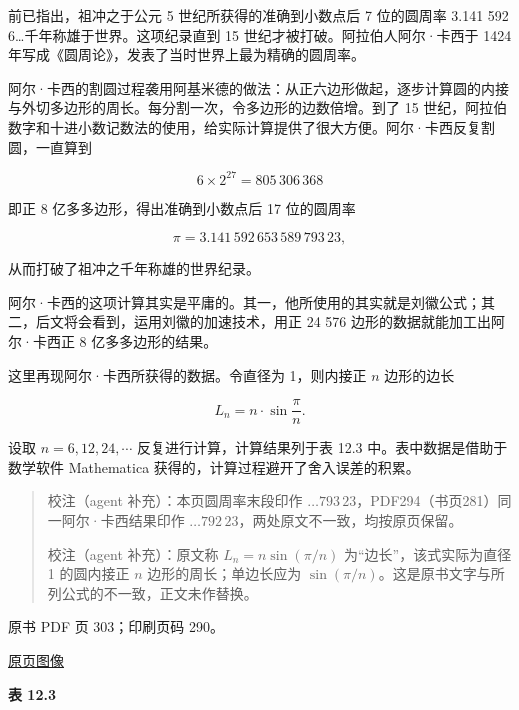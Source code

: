 前已指出，祖冲之于公元 5 世纪所获得的准确到小数点后 7 位的圆周率 3.141 592 6\ldots 千年称雄于世界。这项纪录直到 15 世纪才被打破。阿拉伯人阿尔·卡西于 1424 年写成《圆周论》，发表了当时世界上最为精确的圆周率。

阿尔·卡西的割圆过程袭用阿基米德的做法：从正六边形做起，逐步计算圆的内接与外切多边形的周长。每分割一次，令多边形的边数倍增。到了 15 世纪，阿拉伯数字和十进小数记数法的使用，给实际计算提供了很大方便。阿尔·卡西反复割圆，一直算到

\[
6\times2^{27}=805\,306\,368
\]

即正 8 亿多多边形，得出准确到小数点后 17 位的圆周率

\[
\pi=3.141\,592\,653\,589\,793\,23,
\]

从而打破了祖冲之千年称雄的世界纪录。

阿尔·卡西的这项计算其实是平庸的。其一，他所使用的其实就是刘徽公式；其二，后文将会看到，运用刘徽的加速技术，用正 24 576 边形的数据就能加工出阿尔·卡西正 8 亿多多边形的结果。

这里再现阿尔·卡西所获得的数据。令直径为 1，则内接正 \(n\) 边形的边长

\[
L_n=n\cdot\sin\frac{\pi}{n}.
\]

设取 \(n=6,12,24,\cdots\) 反复进行计算，计算结果列于表 12.3 中。表中数据是借助于数学软件 Mathematica 获得的，计算过程避开了舍入误差的积累。

\begin{quote}
校注（agent 补充）：本页圆周率末段印作 \(\ldots793\,23\)，PDF294（书页281）同一阿尔·卡西结果印作 \(\ldots792\,23\)，两处原文不一致，均按原页保留。

校注（agent 补充）：原文称 \(L_n=n\sin(\pi/n)\) 为``边长''，该式实际为直径 1 的圆内接正 \(n\) 边形的周长；单边长应为 \(\sin(\pi/n)\)。这是原书文字与所列公式的不一致，正文未作替换。
\end{quote}

\clearpage

原书 PDF 页 303；印刷页码 290。

\href{source-images/pdf-303.jpeg}{原页图像}

\textbf{表 12.3}

